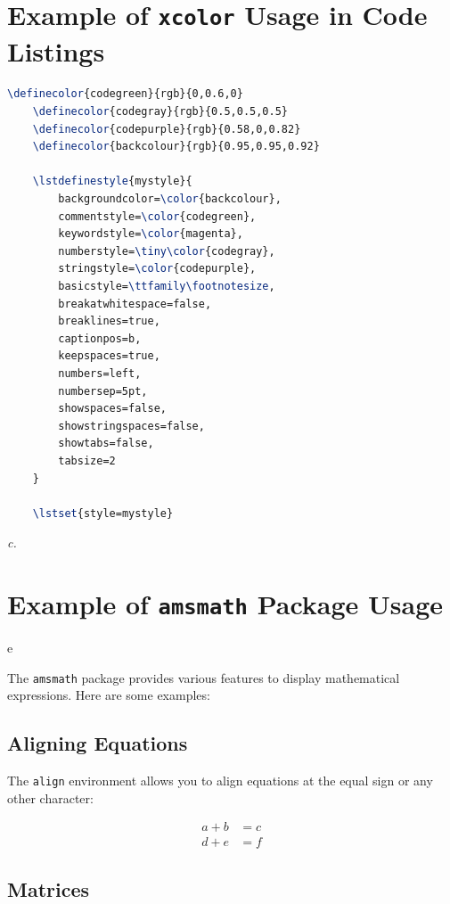 \documentclass[]{article}
\begin{document}
\section{Example of \texorpdfstring{\texttt{xcolor}}{xcolor} Usage in Code Listings}

\begin{lstlisting}[language=TeX]
    \definecolor{codegreen}{rgb}{0,0.6,0}
    \definecolor{codegray}{rgb}{0.5,0.5,0.5}
    \definecolor{codepurple}{rgb}{0.58,0,0.82}
    \definecolor{backcolour}{rgb}{0.95,0.95,0.92}
    
    \lstdefinestyle{mystyle}{
        backgroundcolor=\color{backcolour},   
        commentstyle=\color{codegreen},
        keywordstyle=\color{magenta},
        numberstyle=\tiny\color{codegray},
        stringstyle=\color{codepurple},
        basicstyle=\ttfamily\footnotesize,
        breakatwhitespace=false,         
        breaklines=true,                 
        captionpos=b,                    
        keepspaces=true,                 
        numbers=left,                    
        numbersep=5pt,                  
        showspaces=false,                
        showstringspaces=false,
        showtabs=false,                  
        tabsize=2
    }
    
    \lstset{style=mystyle} 
\end{lstlisting}

\vspace{5mm}\textit{c.}

\section{Example of \texttt{amsmath} Package Usage}e

The \texttt{amsmath} package provides various features to display mathematical expressions. Here are some examples:

\subsection{Aligning Equations}

The \texttt{align} environment allows you to align equations at the equal sign or any other character:

\begin{align}
    a + b &= c \\
    d + e &= f
\end{align}

\subsection{Matrices}
\end{document}
